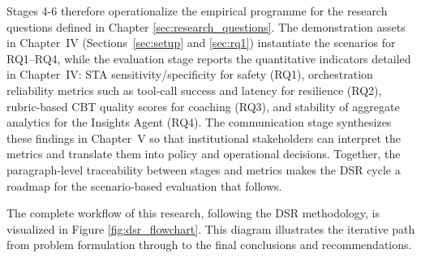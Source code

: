 Stages 4-6 therefore operationalize the empirical programme for the research questions defined in Chapter \ref{sec:research_questions}. The demonstration assets in Chapter~IV (Sections~\ref{sec:setup} and \ref{sec:rq1}) instantiate the scenarios for RQ1--RQ4, while the evaluation stage reports the quantitative indicators detailed in Chapter~IV: STA sensitivity/specificity for safety (RQ1), orchestration reliability metrics such as tool-call success and latency for resilience (RQ2), rubric-based CBT quality scores for coaching (RQ3), and stability of aggregate analytics for the Insights Agent (RQ4). The communication stage synthesizes these findings in Chapter~V so that institutional stakeholders can interpret the metrics and translate them into policy and operational decisions. Together, the paragraph-level traceability between stages and metrics makes the DSR cycle a roadmap for the scenario-based evaluation that follows.

The complete workflow of this research, following the DSR methodology, is visualized in Figure \ref{fig:dsr_flowchart}. This diagram illustrates the iterative path from problem formulation through to the final conclusions and recommendations.


